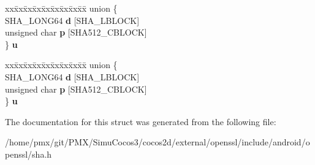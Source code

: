 \begin{DoxyCompactItemize}
\begin{tabbing}
\end{tabbing}\item 
\mbox{\label{structSHA512state__st_a3f227caa73375e1fa513ca3de2cfecac}} 
\begin{tabbing}
xx\=xx\=xx\=xx\=xx\=xx\=xx\=xx\=xx\=\kill
union \{\\
\>SHA\_LONG64 {\bfseries d} \mbox{[}SHA\_LBLOCK\mbox{]}\\
\>unsigned char {\bfseries p} \mbox{[}SHA512\_CBLOCK\mbox{]}\\
\} {\bfseries u}\\

\end{tabbing}\item 
\mbox{\label{structSHA512state__st_afa3bae1ac417f4e69693b95eb5413147}} 
\begin{tabbing}
xx\=xx\=xx\=xx\=xx\=xx\=xx\=xx\=xx\=\kill
union \{\\
\>SHA\_LONG64 {\bfseries d} \mbox{[}SHA\_LBLOCK\mbox{]}\\
\>unsigned char {\bfseries p} \mbox{[}SHA512\_CBLOCK\mbox{]}\\
\} {\bfseries u}\\

\end{tabbing}\end{DoxyCompactItemize}


The documentation for this struct was generated from the following file\+:\begin{DoxyCompactItemize}
\item 
/home/pmx/git/\+P\+M\+X/\+Simu\+Cocos3/cocos2d/external/openssl/include/android/openssl/sha.\+h\end{DoxyCompactItemize}
